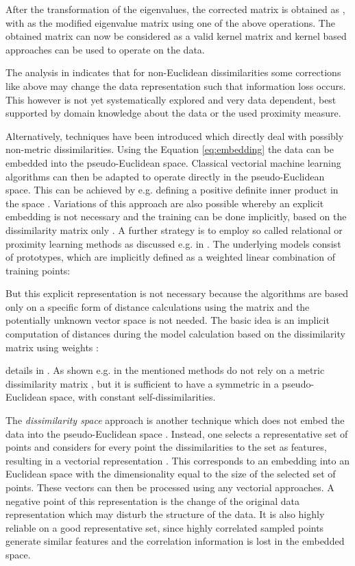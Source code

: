 \documentclass[twoside,11pt]{article}
\begin{document}
After the transformation of the eigenvalues,
the corrected matrix  is obtained as
,
with  as
the modified eigenvalue matrix using one of the above operations.
The obtained matrix  can now be considered
as a valid kernel matrix 
and kernel based approaches can be used to operate on the data.

The analysis in \cite{DBLP:conf/sspr/PekalskaDGB04} indicates that for non-Euclidean dissimilarities some corrections like above 
may change the data representation such that information loss occurs.
This however is not yet systematically explored and very data dependent,
best supported by domain knowledge about the data or the used proximity measure.


Alternatively, techniques have been introduced which directly deal with possibly non-metric dissimilarities.
Using the Equation \eqref{eq:embedding} the data can be embedded into
the pseudo-Euclidean space.
Classical vectorial machine learning algorithms can then be adapted
to operate directly in the pseudo-Euclidean space.
This can be achieved by e.g. defining a positive definite
inner product in the space .
Variations of this approach are also possible
whereby an explicit embedding is not necessary
and the training can be done implicitly,
based on the dissimilarity matrix only \cite{Pekalska2005a}.
A further strategy is to employ so called relational or proximity learning methods as discussed e.g. in \cite{Schleif2012k}.
The underlying models consist of prototypes,
which are implicitly defined as a weighted linear combination of training points: 

But this explicit representation is not necessary because the algorithms are based only 
on a specific form of distance calculations using the matrix  and
the potentially unknown vector space  is not needed.
The basic idea is an implicit computation of distances 
during the model calculation based on the dissimilarity matrix  using weights :

details in \cite{Schleif2012k}.
As shown e.g. in \cite{DBLP:journals/neco/HammerH10} the mentioned methods 
do not rely on a metric dissimilarity matrix ,
but it is sufficient to have a symmetric  in a pseudo-Euclidean space,
with constant self-dissimilarities.

The \emph{dissimilarity space} approach is another technique
which does not embed the data into the pseudo-Euclidean space \cite{Pekalska2005a}.
Instead, one selects a representative set of points 
and considers for every point the dissimilarities to the set 
as features, resulting in a vectorial representation
.
This corresponds to an embedding into an Euclidean space
with the dimensionality equal to the size of the selected set of points.
These vectors can then be processed using any vectorial approaches.
A negative point of this representation is the
change of the original data representation
which may disturb the structure of the data.
It is also highly reliable on a good representative set,
since highly correlated sampled points generate similar features
and the correlation information is lost in the embedded space.
\end{document}
